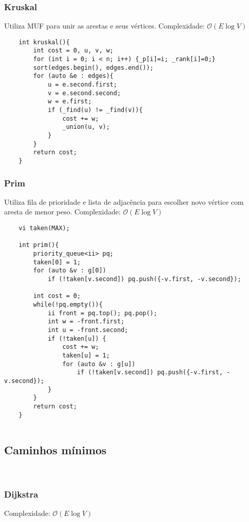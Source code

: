 \subsubsection{Kruskal}
Utiliza MUF para unir as arestas e seus vértices.
Complexidade: $\mathcal{O}(E\log V)$
\begin{verbatim}
    int kruskal(){
        int cost = 0, u, v, w;
        for (int i = 0; i < n; i++) {_p[i]=i; _rank[i]=0;}
        sort(edges.begin(), edges.end());
        for (auto &e : edges){
            u = e.second.first;
            v = e.second.second;
            w = e.first;
            if (_find(u) != _find(v)){
                cost += w;
                _union(u, v);
            }
        }
        return cost;
    }

\end{verbatim}
\subsubsection{Prim}
\par Utiliza fila de prioridade e lista de adjacência para escolher novo vértice com aresta de menor peso.
Complexidade: $\mathcal{O}(E\log V)$

\begin{verbatim}
    vi taken(MAX);

    int prim(){
        priority_queue<ii> pq;
        taken[0] = 1;
        for (auto &v : g[0])
            if (!taken[v.second]) pq.push({-v.first, -v.second});  
    
        int cost = 0;
        while(!pq.empty()){
            ii front = pq.top(); pq.pop();
            int w = -front.first;
            int u = -front.second;
            if (!taken[u]) {
                cost += w;
                taken[u] = 1;
                for (auto &v : g[u])
                    if (!taken[v.second]) pq.push({-v.first, -v.second});  
            }
        }
        return cost;
    }
    
\end{verbatim}
\subsection{Caminhos mínimos}\

\subsubsection{Dijkstra}
Complexidade: $\mathcal{O}(E\log V)$

